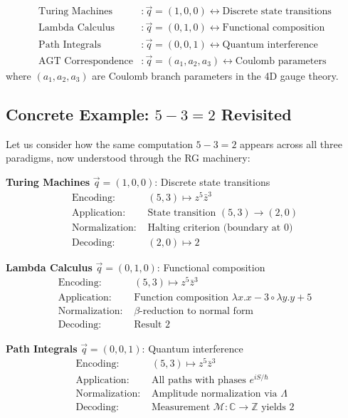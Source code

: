 \begin{definition}
\label{def:parameter-mappings}
\begin{align}
\text{Turing Machines} &: \vec{q} = (1, 0, 0) \leftrightarrow \text{Discrete state transitions} \\
\text{Lambda Calculus} &: \vec{q} = (0, 1, 0) \leftrightarrow \text{Functional composition} \\
\text{Path Integrals} &: \vec{q} = (0, 0, 1) \leftrightarrow \text{Quantum interference} \\
\text{AGT Correspondence} &: \vec{q} = (a_1, a_2, a_3) \leftrightarrow \text{Coulomb parameters}
\end{align}
where $(a_1, a_2, a_3)$ are Coulomb branch parameters in the 4D gauge theory.
\end{definition}

\subsection{Concrete Example: $5 - 3 = 2$ Revisited}

\begin{example}[Parameter Mapping: $5 - 3 = 2$]
\label{ex:5-3-2-rg}
Let us consider how the same computation $5 - 3 = 2$ appears across all three paradigms, now understood through the RG machinery:

\textbf{Turing Machines} $\vec{q} = (1, 0, 0)$: Discrete state transitions
\begin{align}
\text{Encoding: } &(5,3) \mapsto z^5 \bar{z}^3 \\
\text{Application: } &\text{State transition } (5,3) \to (2,0) \\
\text{Normalization: } &\text{Halting criterion (boundary at } 0\text{)} \\
\text{Decoding: } &(2,0) \mapsto 2
\end{align}

\textbf{Lambda Calculus} $\vec{q} = (0, 1, 0)$: Functional composition
\begin{align}
\text{Encoding: } &(5,3) \mapsto z^5 \bar{z}^3 \\
\text{Application: } &\text{Function composition } \lambda x. x-3 \circ \lambda y. y+5 \\
\text{Normalization: } &\text{$\beta$-reduction to normal form} \\
\text{Decoding: } &\text{Result } 2
\end{align}

\textbf{Path Integrals} $\vec{q} = (0, 0, 1)$: Quantum interference
\begin{align}
\text{Encoding: } &(5,3) \mapsto z^5 \bar{z}^3 \\
\text{Application: } &\text{All paths with phases } e^{iS/\hbar} \\
\text{Normalization: } &\text{Amplitude normalization via } \Lambda \\
\text{Decoding: } &\text{Measurement } \mathcal{M}: \mathbb{C} \to \mathbb{Z} \text{ yields } 2
\end{align}
\end{example}

